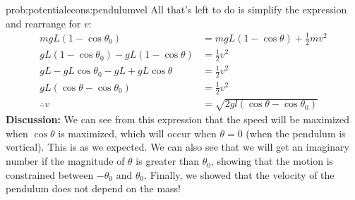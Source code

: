 \begin{solution}{prob:potentialecons:pendulumvel}
All that's left to do is simplify the expression and rearrange for $v$:
\begin{align*}
mgL(1-\cos\theta_0)&=mgL(1-\cos\theta)+\frac{1}{2}mv^2\\
gL(1-\cos\theta_0)-gL(1-\cos\theta)&=\frac{1}{2}v^2\\
gL-gL\cos\theta_0-gL+gL\cos\theta&=\frac{1}{2}v^2\\
gL(\cos\theta-\cos\theta_0)&=\frac{1}{2}v^2\\
\therefore v&=\sqrt{2gl(\cos\theta-\cos\theta_0)}
\end{align*}
\textbf{Discussion:} We can see from this expression that the speed will be maximized when $\cos\theta$ is maximized, which will occur when $\theta=0$ (when the pendulum is vertical). This is as we expected. We can also see that we will get an imaginary number if the magnitude of $\theta$ is greater than $\theta_0$, showing that the motion is constrained between $-\theta_0$ and $\theta_0$. Finally, we showed that the velocity of the pendulum does not depend on the mass!
\end{solution}

